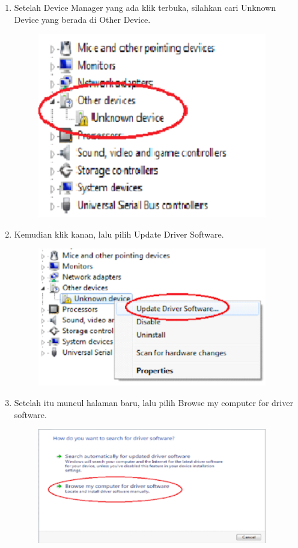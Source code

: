 \begin{enumerate}
\begin{figure}[H]
		\centering
	\end{figure}
	\item Setelah Device Manager yang ada klik terbuka, silahkan cari Unknown Device yang berada di Other Device.
	\begin{figure}[H]
		\includegraphics[width=10cm]{figures/5/1174021/Teori/4.png}
		\centering
	\end{figure}
	\item Kemudian klik kanan, lalu pilih Update Driver Software.
	\begin{figure}[H]
		\includegraphics[width=10cm]{figures/5/1174021/Teori/5.png}
		\centering
	\end{figure}
	\item Setelah itu muncul halaman baru, lalu pilih Browse my computer for driver software.
	\begin{figure}[H]
		\includegraphics[width=10cm]{figures/5/1174021/Teori/6.png}

\end{figure}
\end{enumerate}
